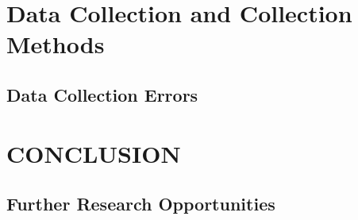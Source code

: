 \documentclass[12pt]{article}
\begin{document}
\begin{multicols}{2}
\section{Data Collection and Collection Methods}

\subsection{Data Collection Errors}

\section{CONCLUSION}

\subsection{Further Research Opportunities}

	\end{multicols}
\end{document}
